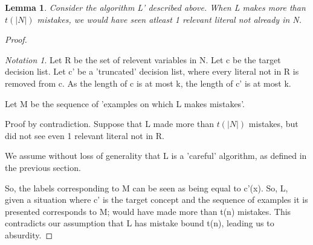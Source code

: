 \documentclass[10pt]{amsart}
\newtheorem{lem}[thm]{Lemma}
\theoremstyle{remark}
\newtheorem*{notation}{Notation}
\begin{document}
\begin{lem}
Consider the algorithm L' described above. When L makes more than $t(|N|)$ mistakes, we would have seen atleast 1 relevant literal not already in N.
\end{lem}
\begin{proof}
\begin{notation}
Let R be the set of relevent variables in N. Let c be the target decision list. Let c' be a 'truncated' decision list, where every literal not in R is removed from c. As the length of c is at most k, the length of c' is at most k.

Let M be the sequence of 'examples on which L makes mistakes'.
\end{notation}

Proof by contradiction. Suppose that L made more than $t(|N|)$ mistakes, but did not see even 1 relevant literal not in R.

We assume without loss of generality that L is a 'careful' algorithm, as defined in the previous section.

So, the labels corresponding to M can be seen as being equal to c'(x). So, L, given a situation where c' is the target concept and the sequence of examples it is presented corresponds to M; would have made more than t(n) mistakes. This contradicts our assumption that L has mistake bound t(n), leading us to absurdity.
\end{proof}

% 
% 
\end{document}
